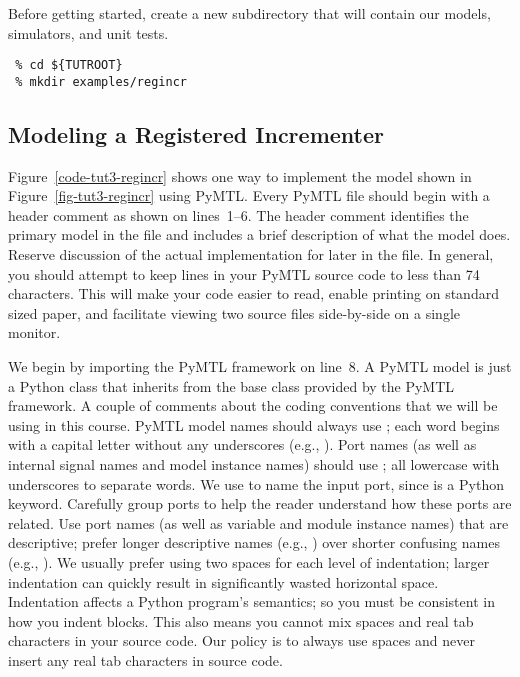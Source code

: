 \documentclass{cbxdoc}
\begin{document}
Before getting started, create a new subdirectory that will contain our
models, simulators, and unit tests.

\begin{verbatim}
 % cd ${TUTROOT}
 % mkdir examples/regincr
\end{verbatim}



\subsection{Modeling a Registered Incrementer}

Figure~\ref{code-tut3-regincr} shows one way to implement the model shown
in Figure~\ref{fig-tut3-regincr} using PyMTL. Every PyMTL file should
begin with a header comment as shown on lines~1--6. The header comment
identifies the primary model in the file and includes a brief description
of what the model does. Reserve discussion of the actual implementation
for later in the file. In general, you should attempt to keep lines in
your PyMTL source code to less than 74 characters. This will make your
code easier to read, enable printing on standard sized paper, and
facilitate viewing two source files side-by-side on a single monitor.

We begin by importing the PyMTL framework on line~8. A PyMTL model is
just a Python class that inherits from the  base class provided
by the PyMTL framework. A couple of comments about the coding conventions
that we will be using in this course. PyMTL model names should always use
; each word begins with a capital letter without any
underscores (e.g., ). Port names (as well as internal signal
names and model instance names) should use ; all
lowercase with underscores to separate words. We use  to name
the input port, since  is a Python keyword. Carefully group ports
to help the reader understand how these ports are related. Use port names
(as well as variable and module instance names) that are descriptive;
prefer longer descriptive names (e.g., ) over shorter
confusing names (e.g., ). We usually prefer using two spaces for
each level of indentation; larger indentation can quickly result in
significantly wasted horizontal space. Indentation affects a Python
program's semantics; so you must be consistent in how you indent blocks.
This also means you cannot mix spaces and real tab characters in your
source code. Our policy is to always use spaces and never insert any real
tab characters in source code.
\end{document}
